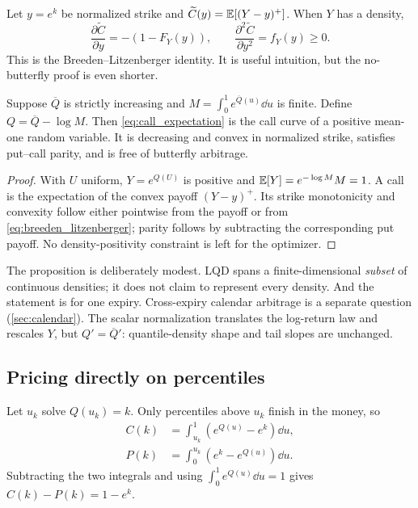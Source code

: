 \documentclass[11pt]{article}
\begin{document}
Let $y=e^k$ be normalized strike and
$\widetilde C(y)=\mathbb{E}[(Y-y)^+]$.  When $Y$ has a density,
\begin{equation}
\frac{\partial \widetilde C}{\partial y}=-(1-F_Y(y)),
\qquad
\frac{\partial^2\widetilde C}{\partial y^2}=f_Y(y)\ge0.
\label{eq:breeden_litzenberger}
\end{equation}
This is the Breeden--Litzenberger identity.  It is useful intuition, but the
no-butterfly proof is even shorter.

\begin{proposition}
\label{prop:butterfly}
Suppose $\overline Q$ is strictly increasing and
$M=\int_0^1e^{\overline Q(u)}\dd u$ is finite.  Define
$Q=\overline Q-\log M$.  Then \eqref{eq:call_expectation} is the call curve of
a positive mean-one random variable.  It is decreasing and convex in normalized
strike, satisfies put--call parity, and is free of butterfly arbitrage.
\end{proposition}

\begin{proof}
With $U$ uniform, $Y=e^{Q(U)}$ is positive and
$\mathbb{E}[Y]=e^{-\log M}M=1$.  A call is the expectation of the convex payoff
$(Y-y)^+$.  Its strike monotonicity and convexity follow either pointwise from
the payoff or from \eqref{eq:breeden_litzenberger}; parity follows by subtracting
the corresponding put payoff.  No density-positivity constraint is left for
the optimizer.
\end{proof}

The proposition is deliberately modest.  LQD spans a finite-dimensional
\emph{subset} of continuous densities; it does not claim to represent every
density.  And the statement is for one expiry.  Cross-expiry calendar
arbitrage is a separate question (\cref{sec:calendar}).  The scalar
normalization translates the log-return law and rescales $Y$, but
$Q'=\overline Q'$: quantile-density shape and tail slopes are unchanged.

\subsection{Pricing directly on percentiles}

Let $u_k$ solve $Q(u_k)=k$.  Only percentiles above $u_k$ finish in the money,
so
\begin{align}
C(k)
  &=\int_{u_k}^{1}\left(e^{Q(u)}-e^k\right)\dd u,
\label{eq:call_u}\\
P(k)
  &=\int_{0}^{u_k}\left(e^k-e^{Q(u)}\right)\dd u.
\end{align}
Subtracting the two integrals and using $\int_0^1e^{Q(u)}\dd u=1$ gives
$C(k)-P(k)=1-e^k$.
\end{document}
